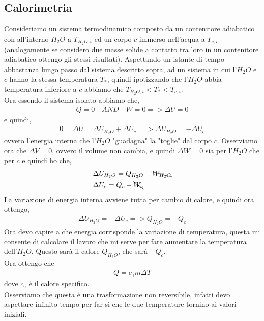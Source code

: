     \subsection{Calorimetria}
        Consideriamo un sistema termodinamico composto da un contenitore adiabatico con all'interno $H_2O$ a $T_{H_2O,i}$ ed un corpo $c$ immerso nell'acqua a $T_{c,i}$ (analogamente se considero due masse solide a contatto tra loro in un contenitore adiabatico ottengo gli stessi risultati). Aspettando un istante di tempo abbastanza lungo passo dal sistema descritto sopra, ad un sistema in cui l'$H_2O$ e $c$ hanno la stessa temperatura $T_*$, quindi ipotizzando che l'$H_2O$ abbia temperatura inferiore a $c$ abbiamo che $T_{H_2O,i}<T_*<T_{c,i}$.\\
        Ora essendo il sistema isolato abbiamo che,
        \begin{align*}
            Q = 0 \quad AND\quad W = 0 => \Delta U = 0
        \end{align*}
        e quindi,
        \begin{align*}
            0=\Delta U=\Delta U_{H_2O} + \Delta U_c => \Delta U_{H_2O} = - \Delta U_c
        \end{align*}
        ovvero l'energia interna che l'$H_2O$ "guadagna" la "toglie" dal corpo $c$. Osserviamo ora che $\Delta V = 0$, ovvero il volume non cambia, e quindi $\Delta W = 0$ sia per l'$H_2O$ che per $c$ e quindi ho che,
        \begin{align*}
            &\Delta U_{H_2O}=Q_{H_2O} - \bcancel{W_{H_2O}}\\
            &\Delta U_c=Q_c - \bcancel{W_c}
        \end{align*}
        La variazione di energia interna avviene tutta per cambio di calore, e quindi ora ottengo,
        \begin{align*}
            \Delta U_{H_2O} = - \Delta U_c => Q_{H_2O} = -Q_c
        \end{align*}
        Ora devo capire a che energia corrisponde la variazione di temperatura, questa mi consente di calcolare il lavoro che mi serve per fare aumentare la temperatura dell'${H_2O}$. Questo sarà il calore $Q_{H_2O}$, che sarà $-Q_c$.\\
        Ora ottengo che
        \begin{align*}
            Q = c_{\gamma}m\Delta T
        \end{align*}
        dove $c_{\gamma}$ è il calore specifico.\\
        Osserviamo che questa è una trasformazione non reversibile, infatti devo aspettare infinito tempo per far si che le due temperature tornino ai valori iniziali.

